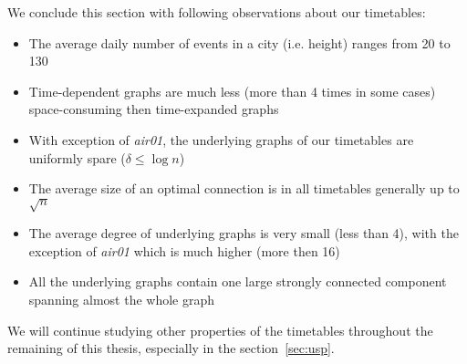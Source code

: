 	\noindent We conclude this section with following observations about our timetables:
	\begin{itemize}
		\item The average daily number of events in a city (i.e. height) ranges from 20 to 130
		\item Time-dependent graphs are much less (more than 4 times in some cases) space-consuming then time-expanded graphs
		\item With exception of \textit{air01}, the underlying graphs of our timetables are uniformly spare ($\delta \leq \log n$) 
		\item The average size of an optimal connection is in all timetables generally up to $\sqrt{n}$
		\item The average degree of underlying graphs is very small (less than 4), with the exception of \textit{air01} which is much higher (more then 16)
		\item All the underlying graphs contain one large strongly connected component spanning almost the whole graph
	\end{itemize}
	\hspace{\fill}
	
	\noindent We will continue studying other properties of the timetables throughout the remaining of this thesis, especially in the section~\ref{sec:usp}.
	